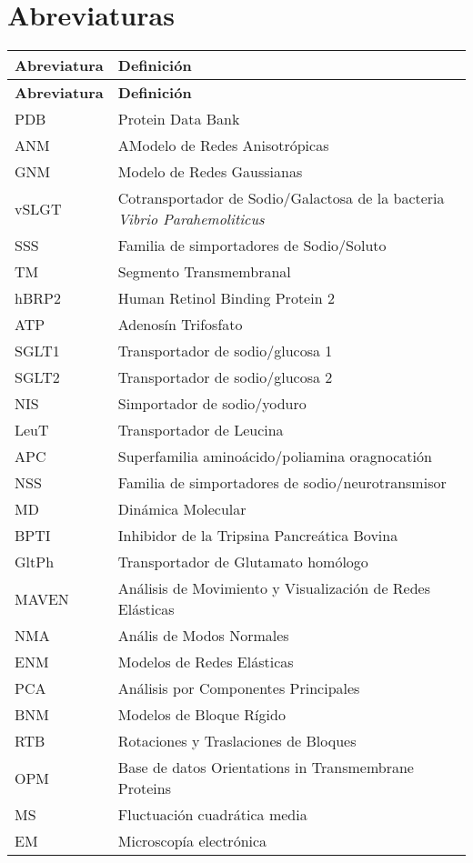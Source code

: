 \section*{Abreviaturas}
\begin{longtable}[l]{ll}\hline
   \textbf{Abreviatura} & \textbf{Definici\'{o}n} \\
 \hline%
  \endfirsthead%
 \textbf{Abreviatura} & \textbf{Definici\'{o}n} \\
  \hline%
 \endhead%
\renewcommand{\arraystretch}{1.4}\label{abre}
PDB&Protein Data Bank\\
ANM&AModelo de Redes Anisotr\'{o}picas\\
GNM&Modelo de Redes Gaussianas\\
vSLGT&Cotransportador de Sodio/Galactosa de la bacteria \textit{Vibrio Parahemoliticus}\\
SSS&Familia de simportadores de Sodio/Soluto\\
TM&Segmento Transmembranal\\ 
hBRP2&Human Retinol Binding Protein 2\\
ATP&Adenos\'{i}n Trifosfato\\
SGLT1&Transportador de sodio/glucosa 1\\
SGLT2&Transportador de sodio/glucosa 2\\
NIS&Simportador de sodio/yoduro\\
LeuT&Transportador de Leucina\\
APC&Superfamilia amino\'{a}cido/poliamina oragnocati\'{o}n\\
NSS&Familia de simportadores de sodio/neurotransmisor \\
MD& Din\'{a}mica Molecular\\
BPTI&Inhibidor de la Tripsina Pancre\'{a}tica Bovina\\
GltPh&Transportador de Glutamato hom\'{o}logo\\
MAVEN& An\'{a}lisis de Movimiento y Visualizaci\'{o}n de Redes El\'{a}sticas\\
NMA&An\'{a}lis de Modos Normales\\
ENM&Modelos de Redes El\'{a}sticas\\
PCA&An\'{a}lisis por Componentes Principales\\
BNM&Modelos de Bloque R\'{i}gido\\
RTB&Rotaciones y Traslaciones de Bloques\\
OPM&Base de datos Orientations in Transmembrane Proteins\\
MS&Fluctuaci\'{o}n cuadr\'{a}tica media\\
EM&Microscop\'{i}a electr\'{o}nica\\
\hline
\end{longtable}
